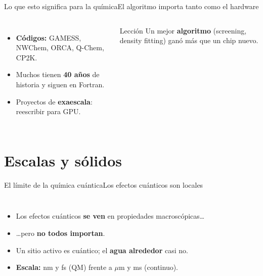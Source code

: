 \documentclass[aspectratio=169]{beamer}
\begin{document}
\begin{frame}{Lo que esto significa para la química}{El algoritmo importa tanto como el hardware}
  \begin{columns}[T,onlytextwidth]
      \begin{itemize}\setlength\itemsep{4pt}
        \item \textbf{Códigos:} GAMESS, NWChem, ORCA, Q-Chem, CP2K.
        \item Muchos tienen \textbf{40 años} de historia y siguen en Fortran.
        \item Proyectos de \textbf{exaescala}: reescribir para GPU.
      \end{itemize}
      \begin{exampleblock}{Lección}
        Un mejor \textbf{algoritmo} (screening, density fitting) ganó más que un chip nuevo.
      \end{exampleblock}
  \end{columns}
\end{frame}

\section{Escalas y sólidos}

\begin{frame}{El límite de la química cuántica}{Los efectos cuánticos son locales}
  \begin{columns}[T,onlytextwidth]
      \begin{itemize}\setlength\itemsep{5pt}
        \item Los efectos cuánticos \textbf{se ven} en propiedades macroscópicas\ldots
        \item \ldots pero \textbf{no todos importan}.
        \item Un sitio activo es cuántico; el \textbf{agua alrededor} casi no.
        \item \textbf{Escala:} nm y fs (QM) frente a $\mu$m y ms (continuo).
      \end{itemize}
      \centering
  \end{columns}
\end{frame}
\end{document}
